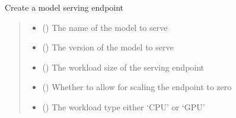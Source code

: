 \documentclass[letterpaper,10pt,english]{sphinxmanual}
\begin{document}
\begin{fulllineitems}
\begin{fulllineitems}
\label{\detokenize{aisquared.platform:aisquared.platform.DatabricksClient.DatabricksClient.create_served_model}}
\pysigstartsignatures
{}
\pysigstopsignatures
\sphinxAtStartPar
Create a model serving endpoint
\begin{quote}\begin{description}
\begin{itemize}
\item {} 
\sphinxAtStartPar
{} () \textendash{} The name of the model to serve

\item {} 
\sphinxAtStartPar
{} () \textendash{} The version of the model to serve

\item {} 
\sphinxAtStartPar
{} () \textendash{} The workload size of the serving endpoint

\item {} 
\sphinxAtStartPar
{} (\sphinxstyleliteralemphasis{\sphinxupquote{ (}}\sphinxstyleliteralemphasis{\sphinxupquote{)}}) \textendash{} Whether to allow for scaling the endpoint to zero

\item {} 
\sphinxAtStartPar
{} () \textendash{} The workload type \sphinxhyphen{} either ‘CPU’ or ‘GPU’


\end{itemize}
\end{description}
\end{quote}
\end{fulllineitems}
\end{fulllineitems}
\end{document}
